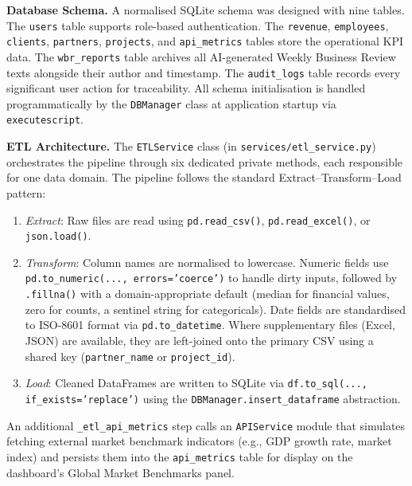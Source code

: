 \documentclass{book}
\begin{document}
\par\noindent
\textbf{Database Schema.} A normalised SQLite schema was designed with nine tables. The \texttt{users} table supports role-based authentication. The \texttt{revenue}, \texttt{employees}, \texttt{clients}, \texttt{partners}, \texttt{projects}, and \texttt{api\_metrics} tables store the operational KPI data. The \texttt{wbr\_reports} table archives all AI-generated Weekly Business Review texts alongside their author and timestamp. The \texttt{audit\_logs} table records every significant user action for traceability. All schema initialisation is handled programmatically by the \texttt{DBManager} class at application startup via \texttt{executescript}.

\par\noindent
\textbf{ETL Architecture.} The \texttt{ETLService} class (in \texttt{services/etl\_service.py}) orchestrates the pipeline through six dedicated private methods, each responsible for one data domain. The pipeline follows the standard Extract--Transform--Load pattern:

\begin{enumerate}
    \item \textit{Extract}: Raw files are read using \texttt{pd.read\_csv()}, \texttt{pd.read\_excel()}, or \texttt{json.load()}.
    \item \textit{Transform}: Column names are normalised to lowercase. Numeric fields use \texttt{pd.to\_numeric(..., errors='coerce')} to handle dirty inputs, followed by \texttt{.fillna()} with a domain-appropriate default (median for financial values, zero for counts, a sentinel string for categoricals). Date fields are standardised to ISO-8601 format via \texttt{pd.to\_datetime}. Where supplementary files (Excel, JSON) are available, they are left-joined onto the primary CSV using a shared key (\texttt{partner\_name} or \texttt{project\_id}).
    \item \textit{Load}: Cleaned DataFrames are written to SQLite via \texttt{df.to\_sql(..., if\_exists='replace')} using the \texttt{DBManager.insert\_dataframe} abstraction.
\end{enumerate}

\par\noindent
An additional \texttt{\_etl\_api\_metrics} step calls an \texttt{APIService} module that simulates fetching external market benchmark indicators (e.g., GDP growth rate, market index) and persists them into the \texttt{api\_metrics} table for display on the dashboard's Global Market Benchmarks panel.
\end{document}
